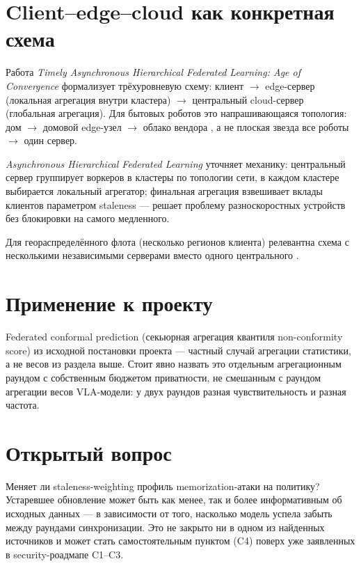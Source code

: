\documentclass[11pt]{article}
\begin{document}
\section{Client--edge--cloud как конкретная схема}

Работа \emph{Timely Asynchronous Hierarchical Federated Learning: Age of
Convergence} \cite{ageofconvergence2023} формализует трёхуровневую схему: клиент
$\to$ edge-сервер (локальная агрегация внутри кластера) $\to$ центральный
cloud-сервер (глобальная агрегация). Для бытовых роботов это напрашивающаяся
топология: \guillemotleft дом $\to$ домовой edge-узел $\to$ облако вендора
\guillemotright, а не плоская звезда \guillemotleft все роботы $\to$ один
сервер\guillemotright.

\emph{Asynchronous Hierarchical Federated Learning} \cite{asynchierarchical2022}
уточняет механику: центральный сервер группирует воркеров в кластеры по топологии
сети, в каждом кластере выбирается локальный агрегатор; финальная агрегация
взвешивает вклады клиентов параметром staleness — решает проблему разноскоростных
устройств без блокировки на самого медленного.

Для геораспределённого флота (несколько регионов клиента) релевантна схема с
несколькими независимыми серверами вместо одного центрального
\cite{multiserver2024}.

\section{Применение к проекту}

Federated conformal prediction (секьюрная агрегация квантиля non-conformity score)
из исходной постановки проекта — частный случай \guillemotleft агрегации статистики,
а не весов\guillemotright{} из раздела выше. Стоит явно назвать это отдельным
агрегационным раундом с собственным бюджетом приватности, не смешанным с раундом
агрегации весов VLA-модели: у двух раундов разная чувствительность и разная частота.

\section{Открытый вопрос}

Меняет ли staleness-weighting профиль memorization-атаки на политику? Устаревшее
обновление может быть как менее, так и более информативным об исходных данных — в
зависимости от того, насколько модель успела \guillemotleft забыть\guillemotright{}
между раундами синхронизации. Это не закрыто ни в одном из найденных источников и
может стать самостоятельным пунктом (C4) поверх уже заявленных в security-роадмапе
C1--C3.
\end{document}
